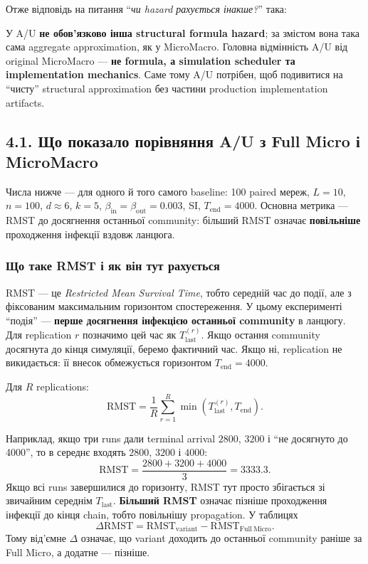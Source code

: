 \documentclass[11pt,a4paper]{article}
\begin{document}
Отже відповідь на питання ``\textit{чи hazard рахується інакше?}'' така:

\begin{tcolorbox}[colback=soft,colframe=macro,title=Коротка відповідь]
У A/U \textbf{не обов'язково інша structural formula hazard}; за змістом вона така сама aggregate approximation, як у MicroMacro. Головна відмінність A/U від original MicroMacro --- \textbf{не formula, а simulation scheduler та implementation mechanics}. Саме тому A/U потрібен, щоб подивитися на ``чисту'' structural approximation без частини production implementation artifacts.
\end{tcolorbox}

\subsection*{4.1. Що показало порівняння A/U з Full Micro і MicroMacro}

Числа нижче --- для одного й того самого baseline: 100 paired мереж, $L=10$, $n=100$, $d\approx6$, $k=5$, $\beta_{\mathrm{in}}=\beta_{\mathrm{out}}=0.003$, SI, $T_{\mathrm{end}}=4000$. Основна метрика --- RMST до досягнення останньої community: більший RMST означає \textbf{повільніше} проходження інфекції вздовж ланцюга.

\subsubsection*{Що таке RMST і як він тут рахується}

RMST --- це \textit{Restricted Mean Survival Time}, тобто середній час до події, але з фіксованим максимальним горизонтом спостереження. У цьому експерименті ``подія'' --- \textbf{перше досягнення інфекцією останньої community} в ланцюгу. Для replication $r$ позначимо цей час як $T_{\mathrm{last}}^{(r)}$. Якщо остання community досягнута до кінця симуляції, беремо фактичний час. Якщо ні, replication не викидається: її внесок обмежується горизонтом $T_{\mathrm{end}}=4000$.

Для $R$ replications:
\[
\mathrm{RMST}
=\frac{1}{R}\sum_{r=1}^{R}
\min\!\left(T_{\mathrm{last}}^{(r)},T_{\mathrm{end}}\right).
\]

Наприклад, якщо три runs дали terminal arrival $2800$, $3200$ і ``не досягнуто до 4000'', то в середнє входять $2800$, $3200$ і $4000$:
\[
\mathrm{RMST}=\frac{2800+3200+4000}{3}=3333.3.
\]
Якщо всі runs завершилися до горизонту, RMST тут просто збігається зі звичайним середнім $T_{\mathrm{last}}$. \textbf{Більший RMST} означає пізніше проходження інфекції до кінця chain, тобто повільнішу propagation. У таблицях
\[
\Delta\mathrm{RMST}=\mathrm{RMST}_{\mathrm{variant}}-\mathrm{RMST}_{\mathrm{Full\ Micro}}.
\]
Тому від'ємне $\Delta$ означає, що variant доходить до останньої community раніше за Full Micro, а додатне --- пізніше.
\end{document}
